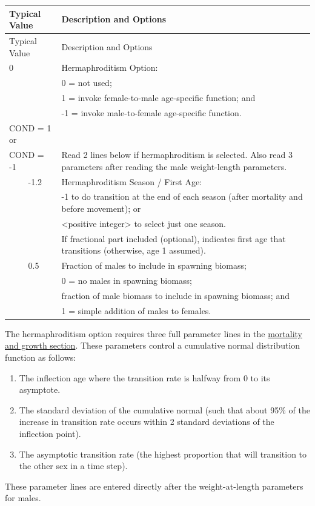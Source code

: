 \begin{longtable}{p{0.5cm} p{2cm} p{13cm}}
	\hline	
	\multicolumn{2}{l}{Typical Value} & Description and Options \Tstrut\Bstrut\\
	\hline
	\endfirsthead

	\hline
	\multicolumn{2}{l}{Typical Value} & Description and Options \Tstrut\Bstrut\\
	\hline
	\endhead
	\hline

	\endfoot
	
	\endlastfoot

	0 & & Hermaphroditism Option: \Tstrut\\
	 &  & 0 = not used; \\
	 &  & 1 = invoke female-to-male age-specific function; and \\
	 &  & -1 = invoke male-to-female age-specific function.\Bstrut\\
	\hline

	\multicolumn{2}{l}{COND = 1 or} \Tstrut & \\
	\multicolumn{2}{l}{COND = -1} & Read 2 lines below if hermaphroditism is selected. Also read 3 parameters after reading the male weight-length parameters. \Bstrut\\
	& -1.2 & Hermaphroditism Season / First Age: \\
	&     & -1 to do transition at the end of each season (after mortality and before movement); or \\
	&     & <positive integer> to select just one season. \\
    &	  & If fractional part included (optional), indicates first age that transitions (otherwise, age 1 assumed). \\
	& 0.5 & Fraction of males to include in spawning biomass; \\
	&     & 0 = no males in spawning biomass; \\
	&     & fraction of male biomass to include in spawning biomass; and \\
	&     & 1 = simple addition of males to females. \Bstrut\\
	\hline
\end{longtable}
\vspace*{-\baselineskip}

The hermaphroditism option requires three full parameter lines in the \hyperlink{HermaphroditeBiology}{mortality and growth section}. These parameters control a cumulative normal distribution function as follows:
\begin{enumerate}
	\item The inflection age where the transition rate is halfway from 0 to its asymptote.
	\item The standard deviation of the cumulative normal (such that about 95\% of the increase in transition rate occurs within 2 standard deviations of the inflection point).
	\item The asymptotic transition rate (the highest proportion that will transition to the other sex in a time step).
\end{enumerate}
These parameter lines are entered directly after the weight-at-length parameters for males.

